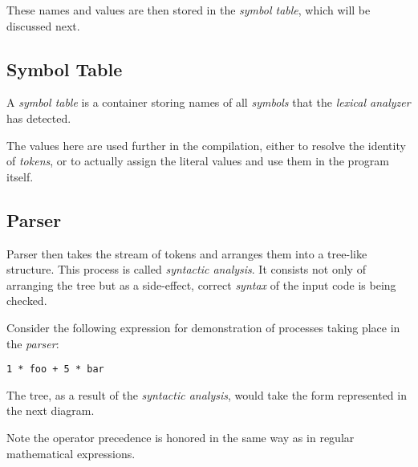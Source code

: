             These names and values are then stored in the \emph{symbol table}, which will be discussed next.

        \subsection{Symbol Table}

            A \emph{symbol table} is a container storing names of all \emph{symbols} that the \emph{lexical analyzer} has detected.

            The values here are used further in the compilation, either to resolve the identity of \emph{tokens}, or to actually assign the literal values and use them in the program itself.

        \subsection{Parser}

            Parser then takes the stream of tokens and arranges them into a tree-like structure. This process is called \emph{syntactic analysis}. It consists not only of arranging the tree but as a side-effect, correct \emph{syntax} of the input code is being checked.

            Consider the following expression for demonstration of processes taking place in the \emph{parser}:

            \begin{center}
            \verb|1 * foo + 5 * bar|
            \end{center}

            The tree, as a result of the \emph{syntactic analysis}, would take the form represented in the next diagram.

            Note the operator precedence is honored in the same way as in regular mathematical expressions.

            \begin{center}\end{center}

